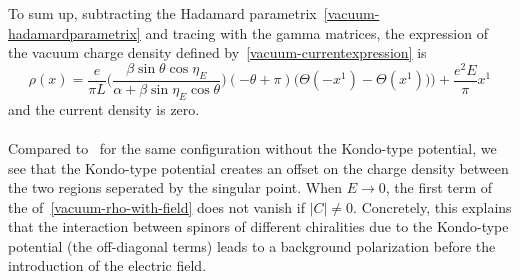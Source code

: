 To sum up,
subtracting the Hadamard parametrix~\cref{vacuum-hadamardparametrix} and tracing with the gamma matrices, 
the expression of the vacuum charge density defined by~\cref{vacuum-currentexpression} is
\begin{equation}\label{vacuum-rho-with-field}
\rho(x) = \frac{e}{\pi L}\Big( \frac{\beta \sin \theta \cos \eta_E}{\alpha + \beta \sin \eta_E \cos \theta}\Big) (-\theta + \pi)
\Big(\Theta(- x^1) - \Theta(x^1))\Big) + \frac{e^2 E}{\pi} x^1
\end{equation}
and the current density is zero. \\\\
%
Compared to~\cite{Zahn2015} for the same configuration without the Kondo-type potential, 
we see that the Kondo-type potential creates an offset on the charge density between the two regions seperated by the singular point.
When $E\rightarrow 0$, the first term of the \lhs of~\cref{vacuum-rho-with-field} does not vanish if $|C| \neq 0$.
Concretely, this explains that the interaction between spinors of different chiralities due to the Kondo-type potential (the off-diagonal terms) leads to a background polarization before the introduction of the electric field.
